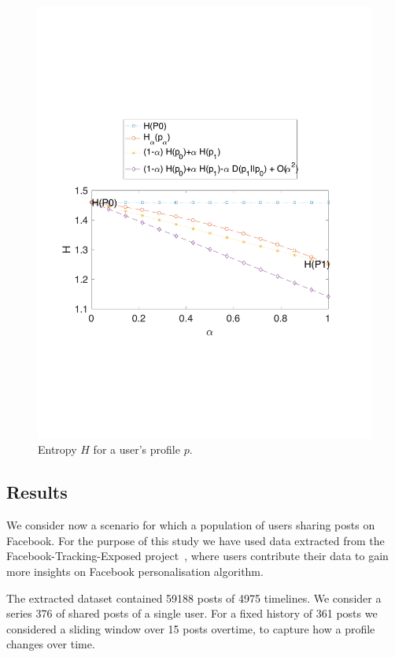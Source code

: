 \begin{figure}[htb]
\includegraphics[scale=\textwidth]{figures/example_1_H.pdf}
\caption[Entropy for a given user profile]{Entropy $H$ for a user's profile $p$.}
\label{fig:6}
\end{figure}

\subsection{Results}

We consider now a scenario for which a population of users sharing posts on Facebook. For the purpose of this study we have used data extracted from the Facebook-Tracking-Exposed project~\cite{FTE}, where users contribute their data to gain more insights on Facebook personalisation algorithm.

The extracted dataset contained 59188 posts of 4975 timelines. We consider a series 376 of shared posts of a single user. For a fixed history of 361 posts we considered a sliding window over 15 posts overtime, to capture how a profile changes over time.


